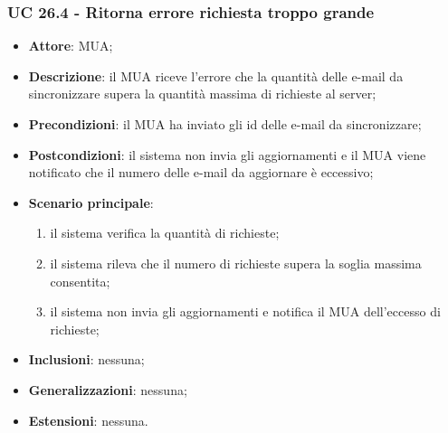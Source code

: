     \subsubsection{UC 26.4 - Ritorna errore richiesta troppo grande} \label{sec:UC26.4}
    \begin{itemize}
        \item \textbf{Attore}: MUA;
        \item \textbf{Descrizione}: il MUA riceve l'errore che la quantità delle e-mail da sincronizzare supera la quantità massima di richieste al server;
        \item \textbf{Precondizioni}: il MUA ha inviato gli id delle e-mail da sincronizzare;
        \item \textbf{Postcondizioni}: il sistema non invia gli aggiornamenti e il MUA viene notificato che il numero delle e-mail da aggiornare è eccessivo;
        \item \textbf{Scenario principale}:
            \begin{enumerate}
                \item il sistema verifica la quantità di richieste;
                \item il sistema rileva che il numero di richieste supera la soglia massima consentita;
                \item il sistema non invia gli aggiornamenti e notifica il MUA dell'eccesso di richieste;
            \end{enumerate}
        \item \textbf{Inclusioni}: nessuna;
        \item \textbf{Generalizzazioni}: nessuna;
        \item \textbf{Estensioni}: nessuna.
    \end{itemize}

